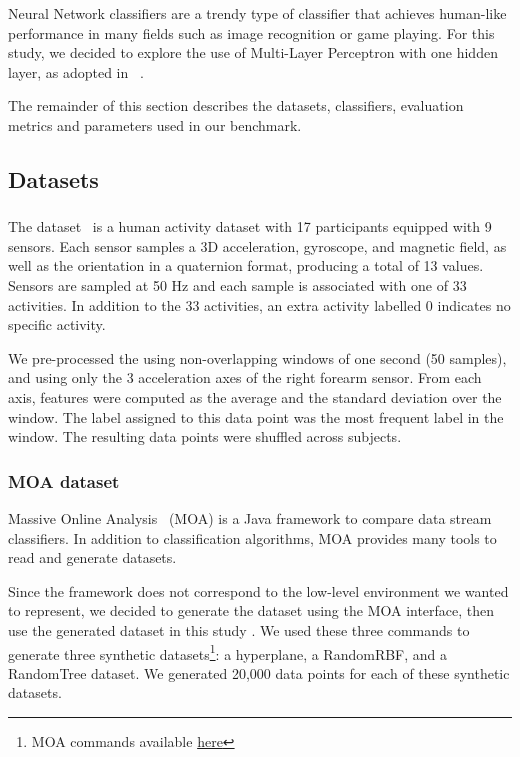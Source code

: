 Neural Network classifiers are a trendy  type of
classifier that achieves
human-like performance in many fields such as
image recognition or game playing. For this study,
we decided to explore the use of Multi-Layer
Perceptron with one hidden layer, as adopted
in~\cite{omid_2019} .

The remainder of this section describes the datasets, classifiers,
evaluation metrics and parameters used in our benchmark.

\subsection{Datasets}
\subsubsection{\banosdataset}
The \banosdataset dataset~\cite{Banos_2014} is a human
activity dataset with 17 participants
equipped with 9 sensors. Each sensor samples a 3D
acceleration, gyroscope, and magnetic field, as well as 
the orientation in a quaternion format, producing a total of 13 values.
Sensors are
sampled at 50 Hz and each sample is associated
with one of 33 activities. In
addition to the 33 activities, an extra activity
labelled 0 indicates no specific activity.

We pre-processed the \banosdataset using
non-overlapping windows of one second (50
samples), and using only the 3 acceleration axes of the
right forearm sensor. From each axis, features were computed as the
average and the standard deviation over the window. The label assigned to this data
point was the most frequent label in the window.
The resulting data points were shuffled
across subjects.

\subsubsection{MOA dataset}
Massive Online Analysis~\cite{moa} (MOA) is a Java framework to compare
data stream classifiers. In addition to classification algorithms, MOA provides many
tools to read and generate datasets.

Since the framework does not correspond to the low-level environment we wanted
to represent, we decided to generate the dataset using the MOA interface, then
use the generated dataset in this study .  We used these three commands to
generate three synthetic datasets\footnote{MOA commands available
\href{https://github.com/azazel7/paper-benchmark/blob/e0c9a94d0d17490f7ab14293dec20b8322a6447c/Makefile\#L90}{here}}:
a hyperplane, a RandomRBF, and a RandomTree
dataset. We generated 20,000 data points
 for each of these synthetic datasets.

